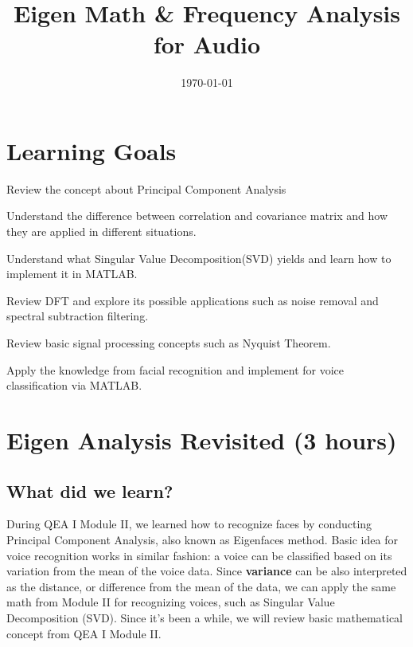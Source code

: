 \documentclass{tufte-handout}
\title{Eigen Math \& Frequency Analysis for Audio}
\author{}
\date{\today}
\begin{document}
\maketitle

\vspace{0.1in}

\section{Learning Goals}

\begin{description}[font=$\bullet$\scshape\bfseries]

\item[]Review the concept about Principal Component Analysis

\item[]Understand the difference between correlation and covariance matrix and how they are applied in different situations. 

\item[]Understand what Singular Value Decomposition(SVD) yields and learn how to implement it in MATLAB.

\item[]Review DFT and explore its possible applications such as noise removal and spectral subtraction filtering.

\item[]Review basic signal processing concepts such as Nyquist Theorem.

\item[]Apply the knowledge from facial recognition and implement for voice classification via MATLAB.

\end{description}



\section{Eigen Analysis Revisited (3 hours)}

\subsection{What did we learn?}
During QEA I Module II, we learned how to recognize faces by conducting Principal Component Analysis, also known as Eigenfaces method. Basic idea for voice recognition works in similar fashion: a voice can be classified based on its variation from the mean of the voice data. Since \textbf{variance} can be also interpreted as the distance, or difference from the mean of the data, we can apply the same math from Module II for recognizing voices, such as Singular Value Decomposition (SVD). Since it's been a while, we will review basic mathematical concept from QEA I Module II. 
\end{document}
